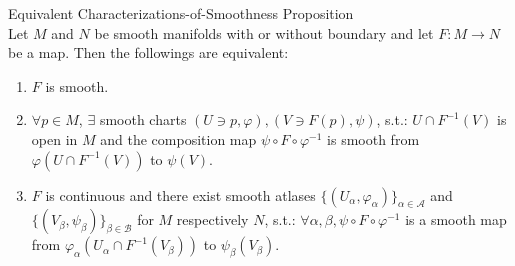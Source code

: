 \begin{proposition}{Equivalent Characterizations-of-Smoothness Proposition}\\
Let $M$ and $N$ be smooth manifolds with or without boundary and let $F:M\to N$ be a map. Then the followings are equivalent:
\begin{enumerate}
    \item $F$ is smooth.
    \item $\forall p\in M$, $\exists$ smooth charts $(U\ni p,\varphi),(V \ni F(p), \psi)$, s.t.: $U \cap F^{-1}(V)$ is open in $M$ and the composition map $\psi\circ F\circ \varphi^{-1}$ is smooth from $\varphi(U \cap F^{-1}(V))$ to $\psi(V)$.
    \item $F$ is continuous and there exist smooth atlases $\{(U_\alpha, \varphi_\alpha)\} _{\alpha \in \mathcal{A}}$ and $\{(V_\beta, \psi_\beta)\}_{\beta\in \mathcal{B}}$ for $M$ respectively $N$, s.t.: $\forall \alpha ,\beta, \psi\circ F\circ \varphi^{-1}$ is a smooth map from $\varphi_{\alpha} (U_\alpha \cap F^{-1} (V_\beta))$ to $\psi_\beta (V_\beta)$.
\end{enumerate}
\end{proposition}

